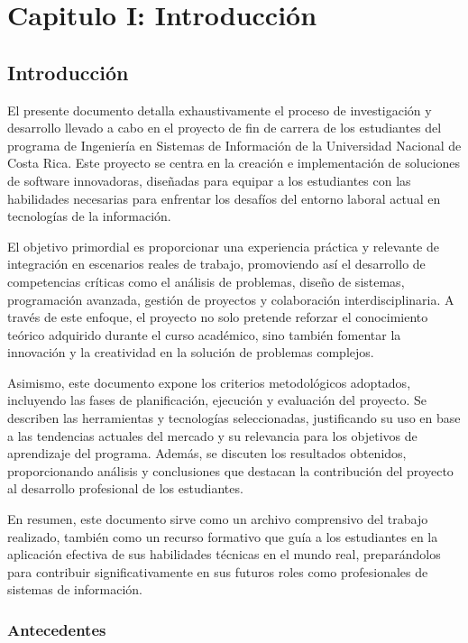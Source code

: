 \chapter{\textbf{ Capitulo I: Introducción}}
\section{Introducción}


El presente documento detalla exhaustivamente el proceso de investigación y desarrollo
llevado a cabo en el proyecto de fin de carrera de los estudiantes del programa de
Ingeniería en Sistemas de Información de la Universidad Nacional de Costa Rica.
Este proyecto se centra en la creación e implementación de soluciones de software
innovadoras, diseñadas para equipar a los estudiantes con las habilidades necesarias
para enfrentar los desafíos del entorno laboral actual en tecnologías de la información.

El objetivo primordial es proporcionar una experiencia práctica y relevante de integración en
escenarios reales de trabajo, promoviendo así el desarrollo de competencias críticas como
el análisis de problemas, diseño de sistemas, programación avanzada, gestión de proyectos y
colaboración interdisciplinaria. A través de este enfoque, el proyecto no solo pretende
reforzar el conocimiento teórico adquirido durante el curso académico, sino también fomentar
la innovación y la creatividad en la solución de problemas complejos.

Asimismo, este documento expone los criterios metodológicos adoptados, incluyendo las fases
de planificación, ejecución y evaluación del proyecto. Se describen las herramientas y tecnologías
seleccionadas, justificando su uso en base a las tendencias actuales del mercado y su relevancia
para los objetivos de aprendizaje del programa. Además, se discuten los resultados obtenidos,
proporcionando análisis y conclusiones que destacan la contribución del proyecto al desarrollo
profesional de los estudiantes.

En resumen, este documento sirve como un archivo comprensivo del trabajo realizado, también como un
recurso formativo que guía a los estudiantes en la aplicación efectiva
de sus habilidades técnicas en el mundo real, preparándolos para contribuir significativamente en
sus futuros roles como profesionales de sistemas de información.

\subsection{Antecedentes}

